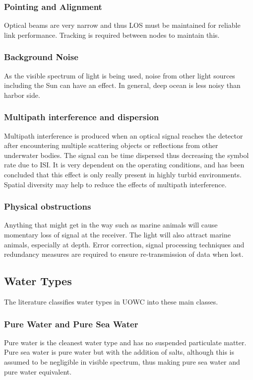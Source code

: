 \documentclass{article}
\begin{document}
\subsubsection{Pointing and Alignment}
Optical beams are very narrow and thus LOS must be maintained for
reliable link performance. Tracking is required between nodes to
maintain this.

\subsubsection{Background Noise}
As the visible spectrum of light is being used, noise from other light
sources including the Sun can have an effect. In general, deep ocean is
less noisy than harbor side.

\subsubsection{Multipath interference and dispersion}
Multipath interference is produced when an optical signal reaches the
detector after encountering multiple scattering objects or reflections
from other underwater bodies. The signal can be time dispersed thus
decreasing the symbol rate due to \ac{ISI}. It is very dependent on the
operating conditions, and has been concluded that this effect is only
really present in highly turbid environments. Spatial diversity may help
to reduce the effects of multipath interference.

\subsubsection{Physical obstructions}
Anything that might get in the way such as marine animals will cause
momentary loss of signal at the receiver. The light will also attract
marine animals, especially at depth. Error correction, signal processing
techniques and redundancy measures are required to ensure re-transmission
of data when lost.

\subsection{Water Types}
The literature classifies water types in \ac{UOWC} into these main classes.

\subsubsection{Pure Water and Pure Sea Water}
Pure water is the cleanest water type and has no suspended particulate
matter. Pure sea water is pure water but with the addition of salts,
although this is assumed to be negligible in visible spectrum, thus
making pure sea water and pure water equivalent.
\end{document}
